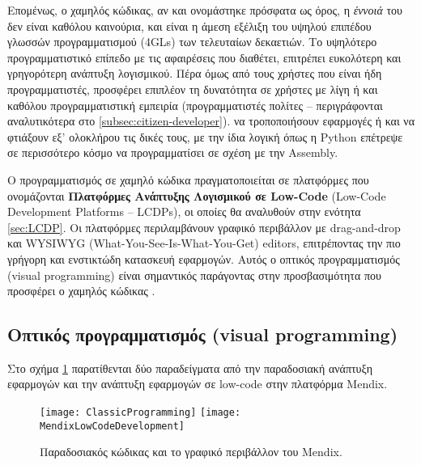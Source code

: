         Επομένως, ο χαμηλός κώδικας, αν και ονομάστηκε πρόσφατα ως όρος, η \textit{έννοιά} του δεν είναι καθόλου καινούρια, και είναι η άμεση εξέλιξη του υψηλού επιπέδου γλωσσών προγραμματισμού (4GLs) των τελευταίων δεκαετιών. Το υψηλότερο προγραμματιστικό επίπεδο με τις αφαιρέσεις που διαθέτει, επιτρέπει ευκολότερη και γρηγορότερη ανάπτυξη λογισμικού. Πέρα όμως από τους χρήστες που είναι ήδη προγραμματιστές, προσφέρει επιπλέον τη δυνατότητα σε χρήστες με λίγη ή και καθόλου προγραμματιστική εμπειρία (προγραμματιστές πολίτες -- περιγράφονται αναλυτικότερα στο \ref{subsec:citizen-developer}). να τροποποιήσουν εφαρμογές ή και να φτιάξουν εξ' ολοκλήρου τις δικές τους, με την ίδια λογική όπως η Python επέτρεψε σε περισσότερο κόσμο να προγραμματίσει σε σχέση με την Assembly.

        Ο προγραμματισμός σε χαμηλό κώδικα πραγματοποιείται σε πλατφόρμες που ονομάζονται \textbf{Πλατφόρμες Ανάπτυξης Λογισμικού σε Low-Code} (Low-Code Development Platforms -- LCDPs), οι οποίες θα αναλυθούν στην ενότητα \ref{sec:LCDP}. Οι πλατφόρμες περιλαμβάνουν γραφικό περιβάλλον με drag-and-drop και WYSIWYG (What-You-See-Is-What-You-Get) editors, επιτρέποντας την πιο γρήγορη και ενστικτώδη κατασκευή εφαρμογών. Αυτός ο οπτικός προγραμματισμός (visual programming) είναι σημαντικός παράγοντας στην προσβασιμότητα που προσφέρει ο χαμηλός κώδικας \cite{LowCodeMendix} \cite{LowCodeSimon} \cite{LowCodeDemocratization}.

            \subsection{Οπτικός προγραμματισμός (visual programming)}
                Στο σχήμα \ref{fig:codevsmendix} παρατίθενται δύο παραδείγματα από την παραδοσιακή ανάπτυξη εφαρμογών και την ανάπτυξη εφαρμογών σε low-code στην πλατφόρμα Mendix.

                \begin{figure}[h!] \noindent
                    \texttt{[image: ClassicProgramming]}
                    \texttt{[image: MendixLowCodeDevelopment]}
                    \caption{Παραδοσιακός κώδικας και το γραφικό περιβάλλον του Mendix.}
                    \label{fig:codevsmendix}
                \end{figure}

